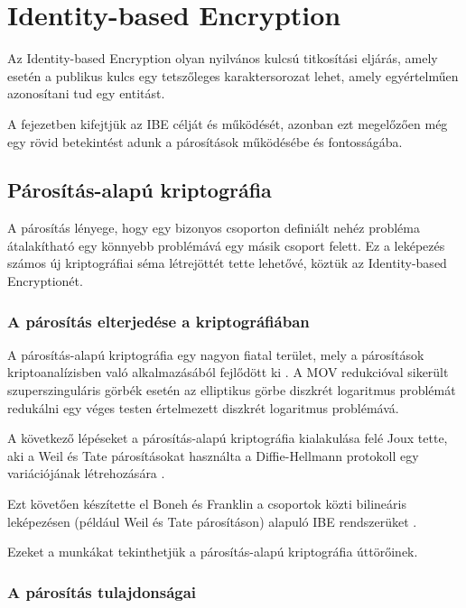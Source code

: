 \chapter{Identity-based Encryption}

Az Identity-based Encryption olyan nyilvános kulcsú titkosítási eljárás, amely esetén a publikus kulcs egy tetszőleges karaktersorozat lehet, amely egyértelműen azonosítani tud egy entitást.

A fejezetben kifejtjük az IBE célját és működését, azonban ezt megelőzően még egy rövid betekintést adunk a párosítások működésébe és fontosságába.

\section{Párosítás-alapú kriptográfia}

A párosítás lényege, hogy egy bizonyos csoporton definiált nehéz probléma átalakítható egy könnyebb problémává egy másik csoport felett. Ez a leképezés számos új kriptográfiai séma létrejöttét tette lehetővé, köztük az Identity-based Encryptionét.

\subsection{A párosítás elterjedése a kriptográfiában}

A párosítás-alapú kriptográfia egy nagyon fiatal terület, mely a párosítások kriptoanalízisben való alkalmazásából fejlődött ki \cite{ReducingEllipticCurveLogarithms}. A MOV redukcióval sikerült szuperszinguláris görbék esetén az elliptikus görbe diszkrét logaritmus problémát redukálni egy véges testen értelmezett diszkrét logaritmus problémává.

A következő lépéseket a párosítás-alapú kriptográfia kialakulása felé Joux tette, aki a Weil és Tate párosításokat használta a Diffie-Hellmann protokoll egy variációjának létrehozására \citeyear{JouxPairingBasedCrypto}.

Ezt követően készítette el Boneh és Franklin a csoportok közti bilineáris leképezésen (például Weil és Tate párosításon) alapuló IBE rendszerüket \citeyear{Boneh::IdentityBasedEncryptionFromTheWeilPairing}. 

Ezeket a munkákat tekinthetjük a párosítás-alapú kriptográfia úttörőinek.

\subsection{A párosítás tulajdonságai}

